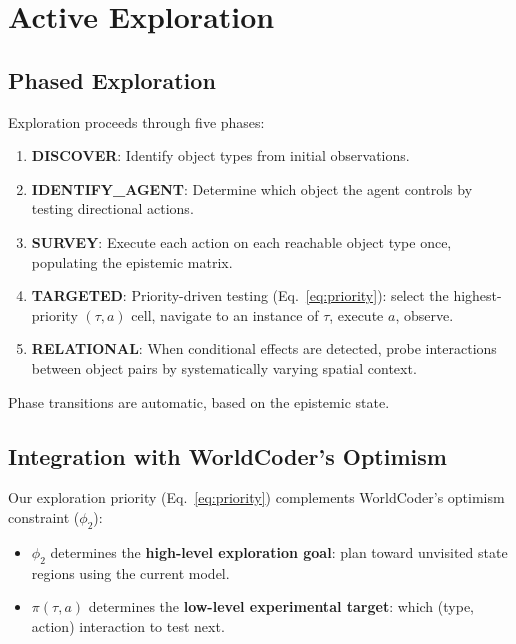 \documentclass{article}
\begin{document}

\section{Active Exploration}
\label{sec:exploration}

\subsection{Phased Exploration}
\label{sec:phases}

Exploration proceeds through five phases:

\begin{enumerate}[nosep]
    \item \textbf{DISCOVER}: Identify object types from initial observations.
    \item \textbf{IDENTIFY\_AGENT}: Determine which object the agent controls
          by testing directional actions.
    \item \textbf{SURVEY}: Execute each action on each reachable object type
          once, populating the epistemic matrix.
    \item \textbf{TARGETED}: Priority-driven testing (Eq.~\ref{eq:priority}):
          select the highest-priority $(\tau, a)$ cell, navigate to an instance
          of $\tau$, execute $a$, observe.
    \item \textbf{RELATIONAL}: When conditional effects are detected, probe
          interactions between object pairs by systematically varying spatial
          context.
\end{enumerate}

Phase transitions are automatic, based on the epistemic state.

\subsection{Integration with WorldCoder's Optimism}
\label{sec:optimism}

Our exploration priority (Eq.~\ref{eq:priority}) complements WorldCoder's
optimism constraint ($\phi_2$):

\begin{itemize}[nosep]
    \item $\phi_2$ determines the \textbf{high-level exploration goal}: plan
          toward unvisited state regions using the current model.
    \item $\pi(\tau, a)$ determines the \textbf{low-level experimental target}:
          which (type, action) interaction to test next.
\end{itemize}
\end{document}
